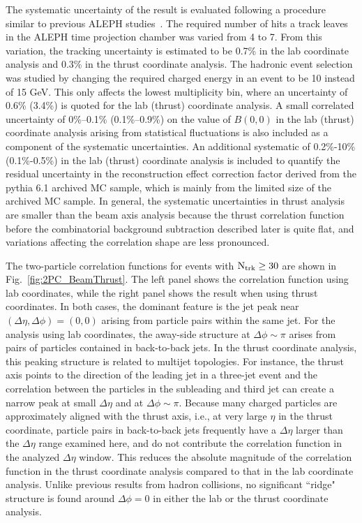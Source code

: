 \documentclass[aps,prl,twocolumn,superscriptaddress,groupedaddress]{revtex4}  %
\begin{document}
The systematic uncertainty of the result is evaluated following a procedure similar to previous ALEPH studies~\cite{Barate:1996fi}. The required number of hits a track leaves in the ALEPH time projection chamber was varied from 4 to 7. From this variation, the tracking uncertainty is estimated to be 0.7\% in the lab coordinate analysis and 0.3\% in the thrust coordinate analysis. The hadronic event selection was studied by changing the required charged energy in an event to be 10 instead of 15 GeV. This only affects the lowest multiplicity bin, where an uncertainty of 0.6\% (3.4\%) is quoted for the lab (thrust) coordinate analysis.  A small correlated uncertainty of 0\%--0.1\% (0.1\%--0.9\%) on the value of $B(0,0)$ in the lab (thrust) coordinate analysis arising from statistical fluctuations is also included as a component of the systematic uncertainties. An additional systematic of 0.2\%-10\% (0.1\%-0.5\%) in the lab (thrust) coordinate analysis is included to quantify the residual uncertainty in the reconstruction effect correction factor derived from the {\sc pythia 6.1} archived MC sample, which is mainly from the limited size of the archived MC sample. In general, the systematic uncertainties in thrust analysis are smaller than the beam axis analysis because the thrust correlation function before the combinatorial background subtraction described later is quite flat, and variations affecting the correlation shape are less pronounced.

The two-particle correlation functions for events with $\rm N_{\text{trk}}\geq30$ are shown in Fig.~\ref{fig:2PC_BeamThrust}. The left panel shows the correlation function using lab coordinates, while the right panel shows the result when using thrust coordinates. In both cases, the dominant feature is the jet peak near $(\Delta\eta,\Delta\phi)=(0,0)$ arising from particle pairs within the same jet. For the analysis using lab coordinates, the away-side structure at $\Delta\phi\sim\pi$ arises from pairs of particles contained in back-to-back jets. In the thrust coordinate analysis, this peaking structure is related to multijet topologies. For instance, the thrust axis points to the direction of the leading jet in a three-jet event and the correlation between the particles in the subleading and third jet can create a narrow peak at small $\Delta\eta$ and at $\Delta\phi\sim\pi$. Because many charged particles are approximately aligned with the thrust axis, i.e., at very large $\eta$ in the thrust coordinate, particle pairs in back-to-back jets frequently have a $\Delta\eta$ larger than the $\Delta\eta$ range examined here, and do not contribute the correlation function in the analyzed $\Delta\eta$ window. This reduces the absolute magnitude of the correlation function in the thrust coordinate analysis compared to that in the lab coordinate analysis. Unlike previous results from hadron collisions, no significant ``ridge" structure is found around $\Delta\phi =0$ in either the lab or the thrust coordinate analysis. 
\end{document}
